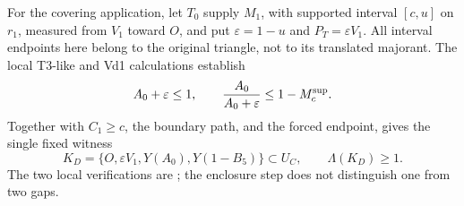 For the covering application, let $T_0$ supply $M_1$, with supported
interval $[c,u]$ on $r_1$, measured from $V_1$ toward $O$, and put
$\varepsilon=1-u$ and $P_T=\varepsilon V_1$. All interval endpoints here
belong to the original triangle, not to its translated majorant.
The local T3-like and Vd1 calculations establish
\[
 A_0+\varepsilon\le1,\qquad
 \frac{A_0}{A_0+\varepsilon}\le1-M_c^{\rm sup}.
\]
Together with $C_1\ge c$, the boundary path, and the forced endpoint,
 gives the single fixed witness
\[
 K_D=\{O,\varepsilon V_1,Y(A_0),Y(1-B_5)\}\subset U_C,
 \qquad \Lambda(K_D)\ge1.
\]
The two local verifications are
;
the enclosure step does not distinguish one from two gaps.




\FloatBarrier


